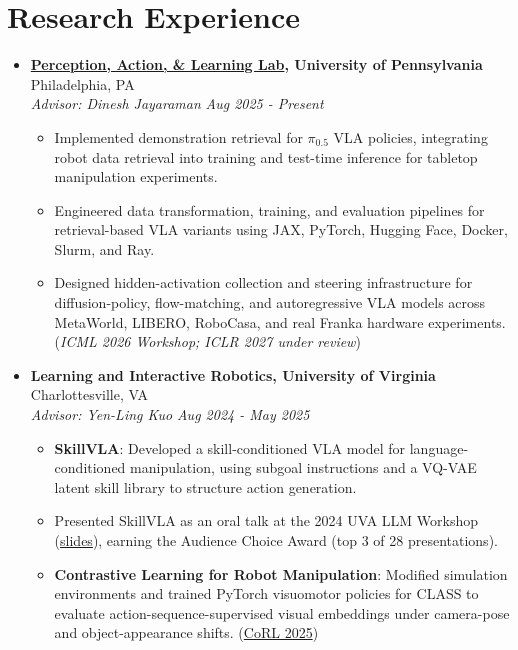 \documentclass[letterpaper,11pt]{article}
\newcommand{\linkhref}[2]{\textcolor{linkblue}{\href{#1}{#2}}}
\newcommand{\Date}[1]{\textit{\small #1}}
\newcommand{\heading}[4]{
  \textbf{#1} \hfill #2 \\
  \textit{\small#3} \hfill \Date{#4}
}
\begin{document}
\section{Research Experience}
\begin{itemize}[label={}, leftmargin=0pt]
    \item \heading{\href{https://penn-pal-lab.github.io/}{Perception, Action, \& Learning Lab}, University of Pennsylvania}{Philadelphia, PA}
          {Advisor: Dinesh Jayaraman}{Aug 2025 - Present}
          \begin{itemize}
              \item Implemented demonstration retrieval for $\pi_{0.5}$ VLA policies, integrating robot data retrieval into training and test-time inference for tabletop manipulation experiments.
              \item Engineered data transformation, training, and evaluation pipelines for retrieval-based VLA variants using JAX, PyTorch, Hugging Face, Docker, Slurm, and Ray.
              \item Designed hidden-activation collection and steering infrastructure for diffusion-policy, flow-matching, and autoregressive VLA models across MetaWorld, LIBERO, RoboCasa, and real Franka hardware experiments. (\textit{ICML 2026 Workshop; ICLR 2027 under review})
          \end{itemize}
    \item \heading{Learning and Interactive Robotics, University of Virginia}{Charlottesville, VA}
          {Advisor: Yen-Ling Kuo}{Aug 2024 - May 2025}
          \begin{itemize}
              \item \textbf{SkillVLA}: Developed a skill-conditioned VLA model for language-conditioned manipulation, using subgoal instructions and a VQ-VAE latent skill library to structure action generation.
              \item Presented SkillVLA as an oral talk at the 2024 UVA LLM Workshop (\linkhref{https://www.brandonyifanyang.com/skillvla.pdf}{slides}), earning the Audience Choice Award (top 3 of 28 presentations).
              \item \textbf{Contrastive Learning for Robot Manipulation}: Modified simulation environments and trained PyTorch visuomotor policies for CLASS to evaluate action-sequence-supervised visual embeddings under camera-pose and object-appearance shifts. (\linkhref{https://class-robot.github.io/}{CoRL 2025})
          \end{itemize}

\end{itemize}
\end{document}
